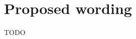 \section{Proposed wording}
\label{sec:wording}

TODO








\renewcommand{\bibname}{References}



